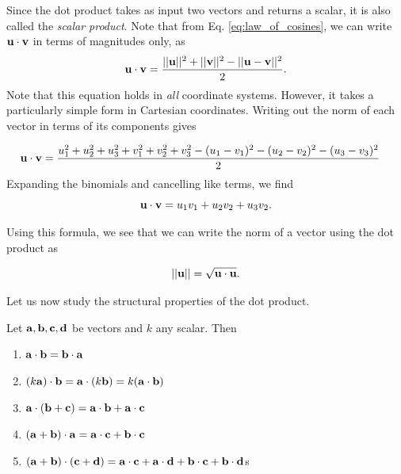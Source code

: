 \documentclass[12pt,letterpaper,reqno]{article}
\numberwithin{equation}{section}
\newcommand{\ti}[1]{\textit{#1}}
\begin{document}
Since the dot product takes as input two vectors and returns a scalar, it is also called the \ti{scalar product}. Note that from Eq. \eqref{eq:law_of_cosines}, we can write ${\bf u}\cdot {\bf v}$ in terms of magnitudes only, as 
\begin{equation}\label{eq:dot_product_magnitudes}
	{\bf u}\cdot {\bf v}=\frac{||{\bf u}||^2+||{\bf v}||^2-||{\bf u}-{\bf v}||^2}{2}.
\end{equation}
Note that this equation holds in \ti{all} coordinate systems. However, it takes a particularly simple form in Cartesian coordinates. Writing out the norm of each vector in terms of its components gives

\begin{align*}
	{\bf u}\cdot {\bf v}&=\frac{u_1^2+u_2^2+u_3^2+v_1^2+v_2^2+v_3^2-(u_1-v_1)^2-(u_2-v_2)^2-(u_3-v_3)^2}{2}
\end{align*}
Expanding the binomials and cancelling like terms, we find
\begin{equation}
	{\bf u}\cdot {\bf v}=u_1v_1+u_2v_2+u_3v_2.
\end{equation}

Using this formula, we see that we can write the norm of a vector using the dot product as 

\begin{equation}\label{eq:dot_product_norm}
	||{\bf u}||=\sqrt{{\bf u}\cdot {\bf u}}.
\end{equation}

Let us now study the structural properties of the dot product.

\begin{prop}
	Let ${\bf a}, {\bf b}, {\bf c}, {\bf d}$ be vectors and $k$ any scalar. Then 
	\begin{enumerate}[(1)]
		\item ${\bf a}\cdot {\bf b}={\bf b} \cdot {\bf a}$
		\item $(k {\bf a})\cdot {\bf b}={\bf a}\cdot (k{\bf b})=k({\bf a}\cdot {\bf b})$
		\item ${\bf a}\cdot ({\bf b}+{\bf c})={\bf a}\cdot {\bf b}+{\bf a}\cdot {\bf c}$
		\item $({\bf a}+{\bf b})\cdot {\bf a}={\bf a}\cdot {\bf c}+{\bf b}\cdot {\bf c}$
		\item $({\bf a}+{\bf b})\cdot ({\bf c}+{\bf d})={\bf a}\cdot {\bf c}+{\bf a}\cdot {\bf d}+{\bf b}\cdot {\bf c}+{\bf b}\cdot {\bf d}$s
	\end{enumerate}
\end{prop}
\end{document}
